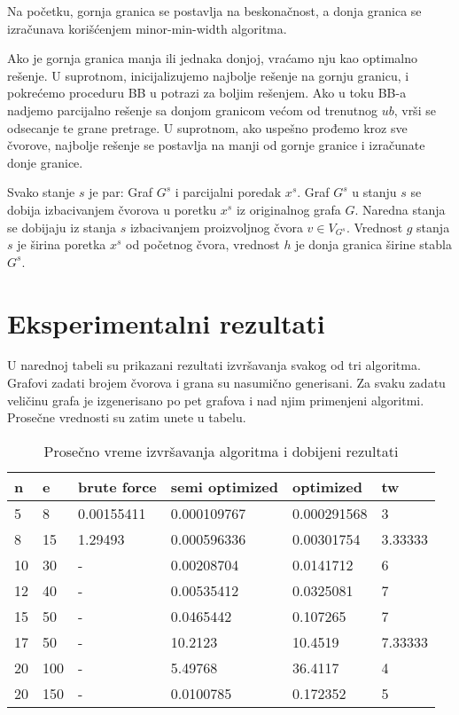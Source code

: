 \documentclass[10pt]{article}
\begin{document}
Na početku, gornja granica se postavlja na beskonačnost, a donja granica se izračunava korišćenjem minor-min-width algoritma.

Ako je gornja granica manja ili jednaka donjoj, vraćamo nju kao optimalno rešenje. U suprotnom, inicijalizujemo najbolje rešenje na gornju granicu, i pokrećemo proceduru BB u potrazi za boljim rešenjem. Ako u toku BB-a nadjemo parcijalno rešenje sa donjom granicom većom od trenutnog $ub$, vrši se odsecanje te grane pretrage. U suprotnom, ako uspešno prođemo kroz sve čvorove, najbolje rešenje se postavlja na manji od gornje granice i izračunate donje granice.

Svako stanje $s$ je par: Graf ${G^s}$ i parcijalni poredak ${x^s}$. Graf ${G^s}$ u stanju $s$ se dobija izbacivanjem čvorova u poretku ${x^s}$ iz originalnog grafa $G$. Naredna stanja se dobijaju iz stanja $s$ izbacivanjem proizvoljnog čvora $v \in V_{G^s}$. Vrednost $g$ stanja $s$ je širina poretka ${x^s}$ od početnog čvora, vrednost $h$ je donja granica širine stabla ${G^s}$.

\section{Eksperimentalni rezultati}


U narednoj tabeli su prikazani rezultati izvršavanja svakog od tri algoritma. Grafovi zadati brojem čvorova i grana su nasumično generisani. Za svaku zadatu veličinu grafa je izgenerisano po pet grafova i nad njim primenjeni algoritmi. Prosečne vrednosti su zatim unete u tabelu.

\begin{table}[h]
\begin{minipage}{.95\textwidth}
\begin{center}\small
    \begin{tabular}{ | p{0.5cm} | p{0.5cm} | p{2cm} | p{3cm} | p{2cm} | p{1cm}|}
    \hline
    \textbf{n} & \textbf{e} & \textbf{brute force} & \textbf{semi optimized} & \textbf{optimized} & \textbf{tw} \\ \hline
    5 & 8 & 0.00155411 & 0.000109767 & 0.000291568 & 3\\ \hline
    8 & 15 & 1.29493 & 0.000596336 & 0.00301754 & 3.33333\\ \hline
    10 & 30 & - & 0.00208704 & 0.0141712 & 6\\ \hline
    12 & 40 & - & 0.00535412 & 0.0325081 & 7\\ \hline
    15 & 50 & - & 0.0465442 & 0.107265 & 7\\ \hline
    17 & 50 & - & 10.2123 & 10.4519 & 7.33333\\ \hline
    20 & 100 & - & 5.49768 & 36.4117 & 4\\ \hline
    20 & 150 & - & 0.0100785 & 0.172352 & 5\\ \hline
    \end{tabular}
    \caption {Prosečno vreme izvršavanja algoritma i dobijeni rezultati}
    \label{analogiesTableEq}
\end{center}
\end{minipage}%
\end{table}
\end{document}
